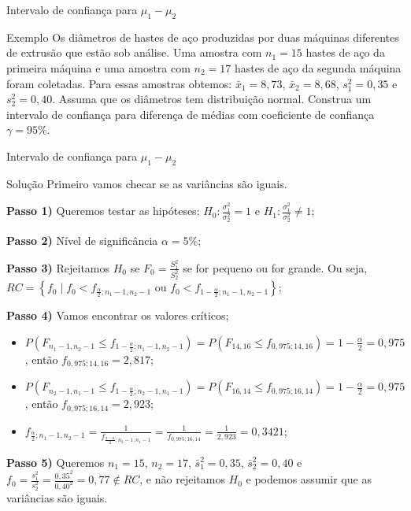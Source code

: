 \documentclass[9pt]{beamer}
\begin{document}
\begin{frame}{Intervalo de confiança para $\mu_1 - \mu_2$}

\large
\begin{block}{Exemplo}
	Os diâmetros de hastes de aço produzidas por duas máquinas diferentes de extrusão que estão sob análise. Uma amostra com $n_1 = 15$ hastes de aço da primeira máquina e uma amostra com $n_2=17$ hastes de aço da segunda máquina foram coletadas. Para essas amostras obtemos: $\bar{x}_1=8,73$, $\bar{x}_2=8,68$, $s_1^2=0,35$  e $s_2^2=0,40$. Assuma que os diâmetros tem distribuição normal. Construa um intervalo de confiança para diferença de médias com coeficiente de confiança $\gamma=95\%$.  
\end{block}
\normalsize

\end{frame}

\begin{frame}{Intervalo de confiança para $\mu_1 - \mu_2$}

\begin{block}{Solução}
	Primeiro vamos checar se as variâncias são iguais.
	
	\textbf{Passo 1)} Queremos testar as hipóteses: $H_0: \frac{\sigma_1^2}{\sigma_2^2} = 1$ e $H_1: \frac{\sigma_1^2}{\sigma_2^2} \neq 1$;
	
	\textbf{Passo 2)} Nível de significância $\alpha=5\%$;
	
	\textbf{Passo 3)} Rejeitamos $H_0$ se $F_0 = \frac{S_1^2}{S_2^2}$ se for pequeno ou for grande. Ou seja, $RC = \left\{ f_0 \mid f_0 < f_{\frac{\alpha}{2}; n_1-1, n_2-1} \mbox{ ou } f_0 < f_{1-\frac{\alpha}{2}; n_1-1, n_2-1} \right\}$;
	
	\textbf{Passo 4)} Vamos encontrar os valores críticos;
	\begin{itemize}
		\item $P(F_{n_1-1, n_2-1} \leq f_{1-\frac{\alpha}{2}; n_1-1, n_2-1}) = P(F_{14, 16} \leq f_{0,975; 14, 16}) = 1 - \frac{\alpha}{2} = 0,975$, então $f_{0,975; 14, 16} = 2,817$;
		\item $P(F_{n_2-1, n_1-1} \leq f_{1-\frac{\alpha}{2}; n_2-1, n_1-1}) = P(F_{16, 14} \leq f_{0,975; 16, 14}) = 1 - \frac{\alpha}{2} = 0,975$, então $f_{0,975; 16, 14} = 2,923$;
		\item $f_{\frac{\alpha}{2}; n_1-1, n_2-1} = \frac{1}{f_{\frac{1-\alpha}{2}; n_2-1, n_1-1}} = \frac{1}{f_{0,975; 16, 14}} = \frac{1}{2,923} = 0,3421$;
	\end{itemize}

	\textbf{Passo 5)} Queremos $n_1=15$, $n_2=17$, $\bar{s}_1^2=0,35$, $\bar{s}_2^2 = 0,40$ e $f_0 = \frac{s_1^2}{s_2^2} = \frac{0,35^2}{0,40^2} = 0,77 \not\in RC$, e não rejeitamos $H_0$ e podemos assumir que as variâncias são iguais.
\end{block}

\end{frame}
\end{document}
